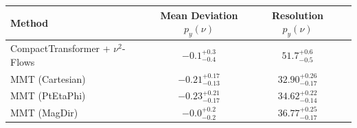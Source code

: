     \begin{tabular}{lccc}
        \toprule
        Method & Mean Deviation $p_{y}(\nu)$ & Resolution $p_{y}(\nu)$ \\
        \midrule
        CompactTransformer + $\nu^2$-Flows & $-0.1^{+0.3}_{-0.4}$ & $51.7^{+0.6}_{-0.5}$ \\
        MMT (Cartesian) & $-0.21^{+0.17}_{-0.13}$ & $32.90^{+0.26}_{-0.17}$ \\
        MMT (PtEtaPhi) & $-0.23^{+0.21}_{-0.17}$ & $34.62^{+0.22}_{-0.14}$ \\
        MMT (MagDir) & $-0.0^{+0.2}_{-0.2}$ & $36.77^{+0.25}_{-0.17}$ \\
        \bottomrule
    \end{tabular}